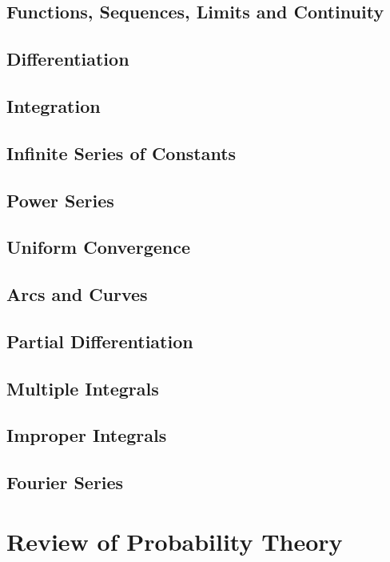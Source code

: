 		\section{Functions, Sequences, Limits and Continuity}

		\section{Differentiation}

		\section{Integration}

		\section{Infinite Series of Constants}

		\section{Power Series}

		\section{Uniform Convergence}

		\section{Arcs and Curves}

		\section{Partial Differentiation}

		\section{Multiple Integrals}

		\section{Improper Integrals}

		\section{Fourier Series}

	\chapter{Review of Probability Theory}
